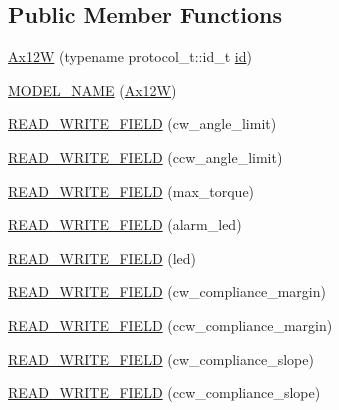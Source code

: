 \subsection*{Public Member Functions}
\begin{DoxyCompactItemize}
\item 
\hyperlink{classdynamixel_1_1servos_1_1_ax12_w_a1bcb20f4269f920f5a711a60f17ca673}{Ax12W} (typename protocol\+\_\+t\+::id\+\_\+t \hyperlink{classdynamixel_1_1servos_1_1_servo_a2d022081672e25a7bb57b76706e1cc57}{id})
\item 
\hyperlink{classdynamixel_1_1servos_1_1_ax12_w_a33029af8f00d4263673a842f115bfde3}{M\+O\+D\+E\+L\+\_\+\+N\+A\+ME} (\hyperlink{classdynamixel_1_1servos_1_1_ax12_w}{Ax12W})
\item 
\hyperlink{classdynamixel_1_1servos_1_1_ax12_w_a683c6a0ff68662bf71614c18b47bcebb}{R\+E\+A\+D\+\_\+\+W\+R\+I\+T\+E\+\_\+\+F\+I\+E\+LD} (cw\+\_\+angle\+\_\+limit)
\item 
\hyperlink{classdynamixel_1_1servos_1_1_ax12_w_a9171930faba3a67a43f260aa66759079}{R\+E\+A\+D\+\_\+\+W\+R\+I\+T\+E\+\_\+\+F\+I\+E\+LD} (ccw\+\_\+angle\+\_\+limit)
\item 
\hyperlink{classdynamixel_1_1servos_1_1_ax12_w_ac74812e7d19c931e5245164295e417cb}{R\+E\+A\+D\+\_\+\+W\+R\+I\+T\+E\+\_\+\+F\+I\+E\+LD} (max\+\_\+torque)
\item 
\hyperlink{classdynamixel_1_1servos_1_1_ax12_w_a9d3e36ab7f682a89f3a1054045411af7}{R\+E\+A\+D\+\_\+\+W\+R\+I\+T\+E\+\_\+\+F\+I\+E\+LD} (alarm\+\_\+led)
\item 
\hyperlink{classdynamixel_1_1servos_1_1_ax12_w_ae2f91de17f564cf35f36e581ab359d7f}{R\+E\+A\+D\+\_\+\+W\+R\+I\+T\+E\+\_\+\+F\+I\+E\+LD} (led)
\item 
\hyperlink{classdynamixel_1_1servos_1_1_ax12_w_abf4199e64359251ca70f701f4dd43b11}{R\+E\+A\+D\+\_\+\+W\+R\+I\+T\+E\+\_\+\+F\+I\+E\+LD} (cw\+\_\+compliance\+\_\+margin)
\item 
\hyperlink{classdynamixel_1_1servos_1_1_ax12_w_a9574fd50704590ae0580889ac06b6ca7}{R\+E\+A\+D\+\_\+\+W\+R\+I\+T\+E\+\_\+\+F\+I\+E\+LD} (ccw\+\_\+compliance\+\_\+margin)
\item 
\hyperlink{classdynamixel_1_1servos_1_1_ax12_w_a04f43f632e9227b74062ad8dc8c3d955}{R\+E\+A\+D\+\_\+\+W\+R\+I\+T\+E\+\_\+\+F\+I\+E\+LD} (cw\+\_\+compliance\+\_\+slope)
\item 
\hyperlink{classdynamixel_1_1servos_1_1_ax12_w_ab8aa5f9bf53e350dcdef7a4305ab15af}{R\+E\+A\+D\+\_\+\+W\+R\+I\+T\+E\+\_\+\+F\+I\+E\+LD} (ccw\+\_\+compliance\+\_\+slope)

\end{DoxyCompactItemize}
